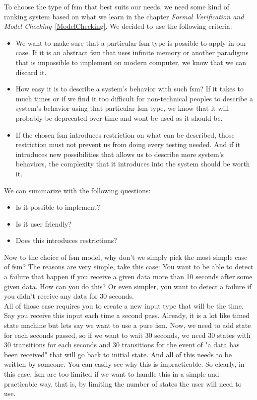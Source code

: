 \documentclass[12pt]{article}
\theoremstyle{definition}
\theoremstyle{definition}
\theoremstyle{remark}
\begin{document}
To choose the type of \gls{fsm} that best suits our needs, we need some kind of ranking system based on what we learn in the chapter \textit{Formal Verification and Model Checking}~\ref{ModelChecking}. We decided to use the following criteria:
\begin{itemize}
\item We want to make sure that a particular \gls{fsm} type is possible to apply in our case. If it is an abstract \gls{fsm} that uses infinite memory or another paradigms that is impossible to implement on modern computer, we know that we can discard it.
\item How easy it is to describe a system's behavior with such \gls{fsm}? If it takes to much times or if we find it too difficult for non-technical peoples to describe a system's behavior using that particular \gls{fsm} type, we know that it will probably be deprecated over time and wont be used as it should be.
\item If the chosen \gls{fsm} introduces restriction on what can be described, those restriction must not prevent us from doing every testing needed. And if it introduces new possibilities that allows us to describe more system's behaviors, the complexity that it introduces into the system should be worth it.
\end{itemize}

We can summarize with the following questions:

\begin{itemize}
\item Is it possible to implement?
\item Is it user friendly?
\item Does this introduces restrictions?
\end{itemize}

Now to the choice of \gls{fsm} model, why don't we simply pick the most simple case of \gls{fsm}? The reasons are very simple, take this case: You want to be able to detect a failure that happen if you receive a given data more than 10 seconds after some given data. How can you do this? Or even simpler, you want to detect a failure if you didn't receive any data for 30 seconds.\\

All of those case requires you to create a new input type that will be the time. Say you receive this input each time a second pass. Already, it is a lot like timed state machine but lets say we want to use a pure \gls{fsm}. Now, we need to add state for each seconds passed, so if we want to wait 30 seconds, we need 30 states with 30 transitions for each seconds and 30 transitions for the event of "a data has been received" that will go back to initial state. And all of this needs to be written by someone. You can easily see why this is impracticable. So clearly, in this case, \gls{fsm} are too limited if we want to handle this in a simple and practicable way, that is, by limiting the number of states the user will need to use.\\
\end{document}
